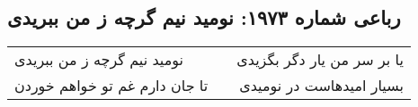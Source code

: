 \begin{center}
\section*{رباعی شماره ۱۹۷۳: نومید نیم گرچه ز من ببریدی}
\label{sec:1973}
\begin{longtable}{l p{0.5cm} r}
نومید نیم گرچه ز من ببریدی
&&
یا بر سر من یار دگر بگزیدی
\\
تا جان دارم غم تو خواهم خوردن
&&
بسیار امیدهاست در نومیدی
\\
\end{longtable}
\end{center}
